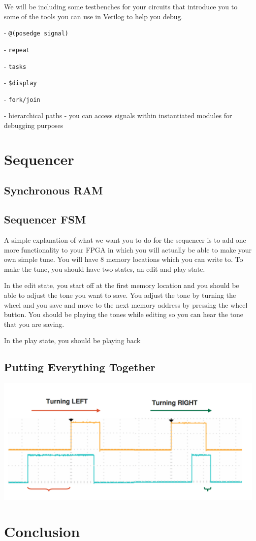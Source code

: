 \documentclass[11pt]{article}
\begin{document}
We will be including some testbenches for your circuits that introduce you to some of the tools you can use in Verilog to help you debug.

- \verb|@(posedge signal)|

- \verb|repeat|

- \verb|tasks|

- \verb|$display|

- \verb|fork/join|

- hierarchical paths - you can access signals within instantiated modules for debugging purposes

\section{Sequencer}

\subsection{Synchronous RAM}

\subsection{Sequencer FSM}

A simple explanation of what we want you to do for the sequencer is to add one more functionality to your FPGA in which you will actually be able to make your own simple tune. You will have 8 memory locations which you can write to. To make the tune, you should have two states, an edit and play state. 

In the edit state, you start off at the first memory location and you should be able to adjust the tone you want to save. You adjust the tone by turning the wheel and you save and move to the next memory address by pressing the wheel button. You should be playing the tones while editing so you can hear the tone that you are saving. 

In the play state, you should be playing back

\subsection{Putting Everything Together}  


\includegraphics[width=\textwidth]{images/lab2_fig6.png}


\section{Conclusion}
\end{document}
